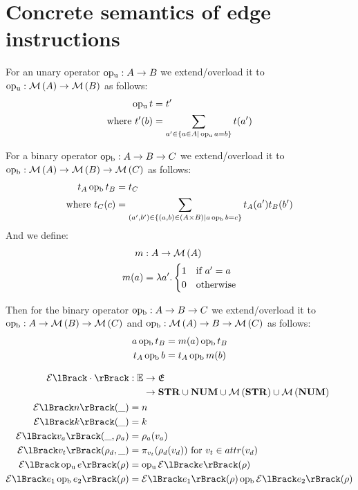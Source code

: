 \section{Concrete semantics of edge instructions}

For an unary operator $\operatorname{op_u} : A \rightarrow B$ we extend/overload it to $\operatorname{op_u} : \mathcal{M}\left(A\right) \rightarrow \mathcal{M}\left(B\right)$ as follows:
\begin{align}
    \operatorname{op_u} t &= t' \\
    \text{where } t'(b) &= \sum_{a' \in \{a \in A | \operatorname{op_u} a = b\}} t(a')
\end{align}

For a binary operator $\operatorname{op_b} : A \rightarrow B \rightarrow C$ we extend/overload it to $\operatorname{op_b} : \mathcal{M}\left(A\right) \rightarrow \mathcal{M}\left(B\right) \rightarrow \mathcal{M}\left(C\right)$ as follows:
\begin{align}
    t_A \operatorname{op_b} t_B &= t_C \\
    \text{where } t_C(c) &= \sum_{(a', b') \in \{(a,b) \in (A \times B) | a \operatorname{op_b} b = c\}} t_A(a') t_B(b')
\end{align}
And we define:
\begin{align}
    m &: A \rightarrow \mathcal{M}\left(A\right) \\
    m(a) &= \lambda a'. \begin{cases}
        1 & \text{if } a' = a\\
        0 & \text{otherwise}
    \end{cases}
\end{align}

Then for the binary operator $\operatorname{op_b} : A \rightarrow B \rightarrow C$ we extend/overload it to $\operatorname{op_b} : A \rightarrow \mathcal{M}\left(B\right) \rightarrow \mathcal{M}\left(C\right)$ and $\operatorname{op_b} : \mathcal{M}\left(A\right) \rightarrow B \rightarrow \mathcal{M}\left(C\right)$ as follows:
\begin{align}
    a \operatorname{op_b} t_B &= m(a) \operatorname{op_b} t_B \\
    t_A \operatorname{op_b} b &= t_A \operatorname{op_b} m(b)
\end{align}


\begin{align}
    \expsem{\cdot} &: \begin{aligned}[t]
        \expressions &\rightarrow \environments \\
        &\rightarrow \strings \cup \integers \cup \powerbag{\strings} \cup \powerbag{\integers}
    \end{aligned} \\
    \expsem{n}(\_) &= n \\
    \expsem{k}(\_) &= k \\
    \expsem{v_a}(\_, \environment_a) &=  \environment_a(v_a) \\
    \expsem{v_t}(\environment_d, \_) &= \pi_{v_t}(\rho_d(v_d)) \text{ for } v_t \in attr(v_d) \\
    \expsem{\unaryoperator e}(\environment) &= \unaryoperator \expsem{e}(\environment) \\
    \expsem{e_1 \binaryoperator e_2}(\environment) &= \expsem{e_1}(\environment) \binaryoperator \expsem{e_2}(\environment)
\end{align}

